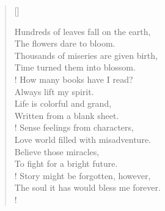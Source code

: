\documentclass[11pt, a4paper]{article} %
\newcommand{\poemauthorcenter}[1]{\nopagebreak{\centering\footnotesize\textsc{#1}\par}} %
\begin{document}


\newpage



\poemauthorcenter{xxx} %

\settowidth{\versewidth}{the soul it has would bless me forever. } %



\begin{verse}[\versewidth]

\begin{patverse} %

Hundreds of leaves fall on the earth, \\
The flowers dare to bloom. \\
Thousands of miseries are given birth, \\
Time turned them into blossom. \\!
How many books have I read? \\
Always lift my spirit. \\
Life is colorful and grand, \\
Written from a blank sheet. \\!
Sense feelings from characters, \\
Love world filled with misadventure. \\
Believe those miracles, \\
To fight for a bright future. \\!
Story might be forgotten, however, \\
The soul it has would bless me forever. \\!

\end{patverse}

\end{verse}
\end{document}
